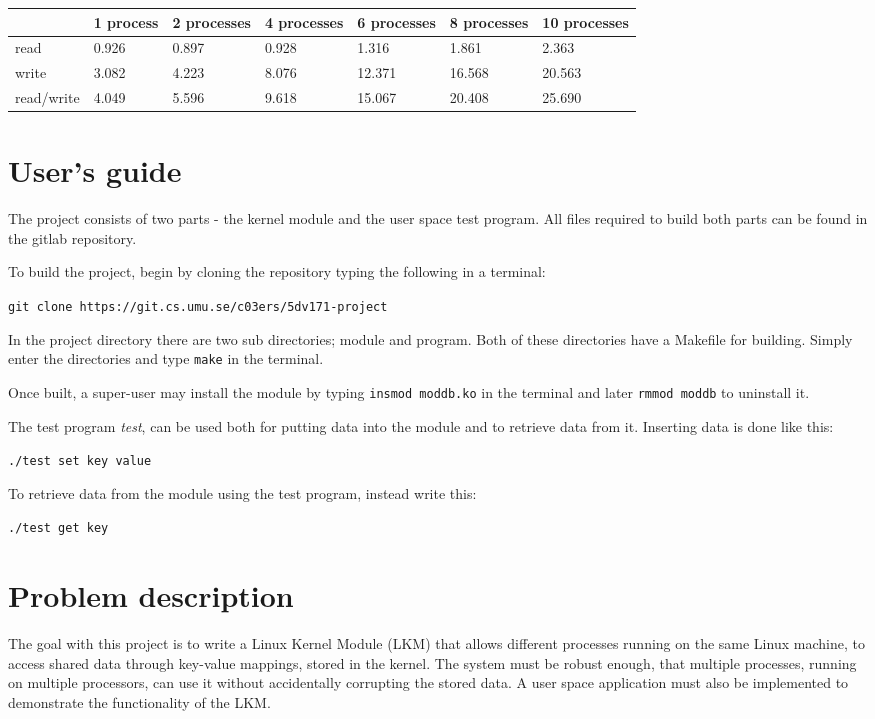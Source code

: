 \documentclass[final,a4paper]{article}
\newcommand{\codebase}{https://git.cs.umu.se/c03ers/5dv171-project}
\begin{document}
\begin{tabular}{|l|l|l|l|l|l|l|}
  \hline
  & 1 process & 2 processes & 4 processes & 6 processes & 8 processes
  & 10 processes \\
  \hline
  read & 0.926 & 0.897 & 0.928 & 1.316 & 1.861 & 2.363 \\
  \hline
  write & 3.082 & 4.223 & 8.076 & 12.371 & 16.568 & 20.563 \\
  \hline
  read/write & 4.049 & 5.596 & 9.618 & 15.067 & 20.408 & 25.690 \\
  \hline

\end{tabular}

\section*{User's guide}
The project consists of two parts - the kernel module and the user space
test program. All files required to build both parts can be found in the gitlab
repository.

To build the project, begin by cloning the repository typing the following in
a terminal:
\begin{center}
{\tt git clone \codebase}
\end{center}
In the project directory there are two sub directories; module and program.
Both of these directories have a Makefile for building. Simply enter the
directories and type {\tt make} in the terminal.

Once built, a super-user may install the module by typing 
{\tt insmod moddb.ko} in the terminal and later {\tt rmmod moddb}
to uninstall it.

The test program \emph{test}, can be used both for putting data
into the module and to retrieve data from it. Inserting data is done like this:
\begin{center}
{\tt ./test set key value}
\end{center}
To retrieve data from the module using the test program, instead write this:
\begin{center}
{\tt ./test get key}
\end{center}

\section*{Problem description}
The goal with this project is to write a Linux Kernel Module (LKM) that allows
different processes running on the same Linux machine, to access shared data
through key-value mappings, stored in the kernel. The system must be robust
enough, that multiple processes, running on multiple processors, can use it
without accidentally corrupting the stored data. A user space application must
also be implemented to demonstrate the functionality of the LKM.
\end{document}
